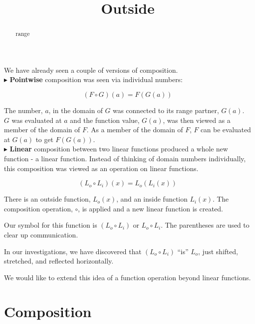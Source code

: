 \documentclass{ximera}
\title{Outside}
\begin{document}
\begin{abstract}
range
\end{abstract}
\maketitle





We have already seen a couple of versions of composition. \\

$\blacktriangleright$ \textbf{\textcolor{purple!85!blue}{Pointwise}} composition was seen via individual numbers: 

\[ (F \circ G)(a) = F(G(a)) \]

The number, $a$, in the domain of $G$ was connected to its range partner, $G(a)$.  $G$ was evaluated at $a$ and the function value, $G(a)$, was then viewed as a member of the domain of $F$.  As a member of the domain of $F$, $F$ can be evaluated at $G(a)$ to get $F(G(a))$. \\




$\blacktriangleright$ \textbf{\textcolor{purple!85!blue}{Linear}} composition between two linear functions produced a whole new function - a linear function.  Instead of thinking of domain numbers individually, this composition was viewed as an operation on linear functions.

\[    (L_o \circ L_i)(x) = L_o(L_i(x))  \]

There is an outside function, $L_o(x)$, and an inside function $L_i(x)$.  The composition operation, $\circ$, is applied and a new linear function is created.  



Our symbol for this function is $(L_o \circ L_i)$ or $L_o \circ L_i$.  The parentheses are used to clear up communication.

In our investigations, we have discovered that $(L_o \circ L_i)$ ``is'' $L_o$, just shifted, stretched, and reflected horizontally.


We would like to extend this idea of a function operation beyond linear functions.





\section{Composition}
\end{document}
